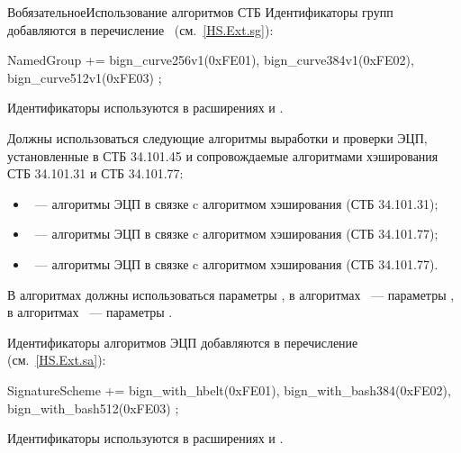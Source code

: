\begin{appendix}{В}{обязательное}{Использование алгоритмов СТБ}
Идентификаторы групп добавляются в перечисление~
(см.~\ref{HS.Ext.sg}):
\begin{codeblock}
NamedGroup += {
  bign_curve256v1(0xFE01),
  bign_curve384v1(0xFE02),
  bign_curve512v1(0xFE03)
};
\end{codeblock}

Идентификаторы используются в расширениях  
и .

\label{BSUITES.DS}

Должны использоваться следующие алгоритмы выработки и проверки ЭЦП,
установленные в СТБ 34.101.45 и сопровождаемые алгоритмами хэширования 
СТБ 34.101.31 и СТБ 34.101.77:
\begin{itemize}
\item
{}~--- алгоритмы ЭЦП в связке c алгоритмом хэширования 
 (СТБ 34.101.31);
\item
{}~--- алгоритмы ЭЦП в связке c алгоритмом хэширования 
 (СТБ 34.101.77);
\item
{}~--- алгоритмы ЭЦП в связке c алгоритмом хэширования 
 (СТБ 34.101.77).
\end{itemize}

В алгоритмах  должны использоваться параметры
, в алгоритмах ~--- 
параметры , в алгоритмах ~--- 
параметры .

Идентификаторы алгоритмов ЭЦП добавляются в перечисление~
(см.~\ref{HS.Ext.sa}):
\begin{codeblock}
SignatureScheme += {
  bign_with_hbelt(0xFE01),
  bign_with_bash384(0xFE02),
  bign_with_bash512(0xFE03)
};
\end{codeblock}

Идентификаторы используются в расширениях  
и .

\end{appendix}
\mbox{}
\vfill
\mbox{}
\clearpage
